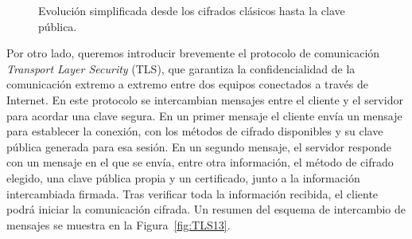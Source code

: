 \begin{figure}[H]
    \centering
    \caption{Evolución simplificada desde los cifrados clásicos hasta la clave pública.}
    \label{fig:evolucion_criptografia}
\end{figure}

Por otro lado, queremos introducir brevemente el protocolo de comunicación \textit{Transport Layer Security} (TLS), que garantiza la confidencialidad de la comunicación extremo a extremo entre dos equipos conectados a través de Internet. En este protocolo se intercambian mensajes entre el cliente y el servidor para acordar una clave segura. En un primer mensaje el cliente envía un mensaje para establecer la conexión, con los métodos de cifrado disponibles y su clave pública generada para esa sesión. En un segundo mensaje, el servidor responde con un mensaje en el que se envía, entre otra información, el método de cifrado elegido, una clave pública propia y un certificado, junto a la información intercambiada firmada. Tras verificar toda la información recibida, el cliente podrá iniciar la comunicación cifrada. Un resumen del esquema de intercambio de mensajes se muestra en la Figura~\ref{fig:TLS13}.

